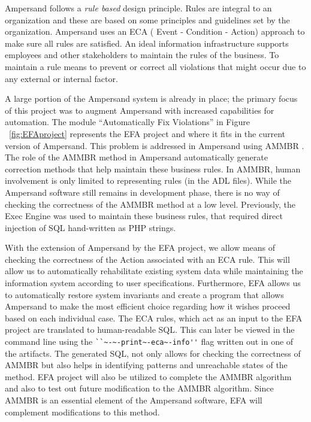

Ampersand follows a \emph{rule based} design principle. Rules are integral to an organization
and these are based on some principles and guidelines set by the organization.
Ampersand uses an ECA ( Event - Condition - Action) approach to make sure all rules are satisfied. An ideal information infrastructure supports employees and other stakeholders to maintain the rules of the business. To maintain a rule means to prevent or correct all violations that might occur due to any external or internal factor.
 
 A large portion of the Ampersand system is already in place; the primary focus of this project was to
augment Ampersand with increased capabilities for automation. The module ``Automatically Fix Violations'' in Figure ~\ref{fig:EFAproject} represents the EFA project and where it fits in the current version of Ampersand.
This problem is addressed in Ampersand using AMMBR \citep{Ampersand}. The role of the AMMBR method in Ampersand automatically generate correction methods that help maintain these business rules. In AMMBR, human involvement is only limited to representing rules (in the ADL files). While the Ampersand software still remains in development phase, there is no way of checking the correctness of the AMMBR method at a low level. Previously, the Exec Engine was used to maintain these business rules, that required direct injection of SQL hand-written as PHP strings. 
 
With the extension of Ampersand by the EFA project, we allow means of checking the correctness of the Action associated with an ECA rule. This will allow us to automatically rehabilitate existing system data while 
maintaining the information system according to user specifications. 
Furthermore, EFA allows us to
automatically restore system invariants and create a program that allows 
Ampersand to make the most efficient choice regarding how it 
wishes proceed 
based on each individual case. The ECA rules, which act as an input to the EFA project are translated to human-readable SQL. This can later be viewed in the command line using the \verb|``~-~-print~-eca~-info''| flag written out in one of the artifacts. The generated SQL, not only allows for checking the correctness of AMMBR but also helps in identifying 
patterns and unreachable states of the method. EFA project will also be utilized to complete the AMMBR algorithm and also to test out future modification to the AMMBR algorithm.  Since AMMBR is an essential element of the Ampersand software, EFA will complement modifications to this method.


